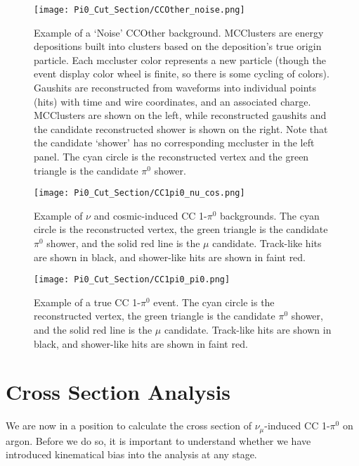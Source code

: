\begin{figure}[H]
\centering
\texttt{[image: Pi0\_Cut\_Section/CCOther\_noise.png]}
\caption{ Example of a `Noise' CCOther background. MCClusters are energy depositions built into clusters based on the deposition’s true origin particle. Each mccluster color represents a new particle (though the event display color wheel is finite, so there is some cycling of colors).  Gaushits are reconstructed from waveforms into individual points (hits) with time and wire coordinates, and an associated charge. MCClusters are shown on the left, while reconstructed gaushits and the candidate reconstructed shower is shown on the right.
 Note that the candidate `shower' has no corresponding mccluster in the left panel. The cyan circle is the reconstructed vertex and the green triangle is the candidate $\pi^0$ shower.  }
\label{fig:ccoth_bkgd_noise}
\end{figure}

\begin{figure}[H]
\centering
\texttt{[image: Pi0\_Cut\_Section/CC1pi0\_nu\_cos.png]}
\caption{ Example of $\nu$ and cosmic-induced CC 1-$\pi^0$ backgrounds. The cyan circle is the reconstructed vertex, the green triangle is the candidate $\pi^0$ shower, and the solid red line is the $\mu$ candidate. Track-like hits are shown in black, and shower-like hits are shown in faint red. }
\label{fig:cc1pi0_nu_cos}
\end{figure}

\begin{figure}[H]
\centering
\texttt{[image: Pi0\_Cut\_Section/CC1pi0\_pi0.png]}
\caption{ Example of a true CC 1-$\pi^0$ event. The cyan circle is the reconstructed vertex, the green triangle is the candidate $\pi^0$ shower, and the solid red line is the $\mu$ candidate. Track-like hits are shown in black, and shower-like hits are shown in faint red. }
\label{fig:cc1pi0_pi0}
\end{figure}





\clearpage
\section{Cross Section Analysis}
\par We are now in a position to calculate the cross section of $\nu_\mu$-induced CC 1-$\pi^0$ on argon.  Before we do so, it is important to understand whether we have introduced kinematical bias into the analysis at any stage.  


